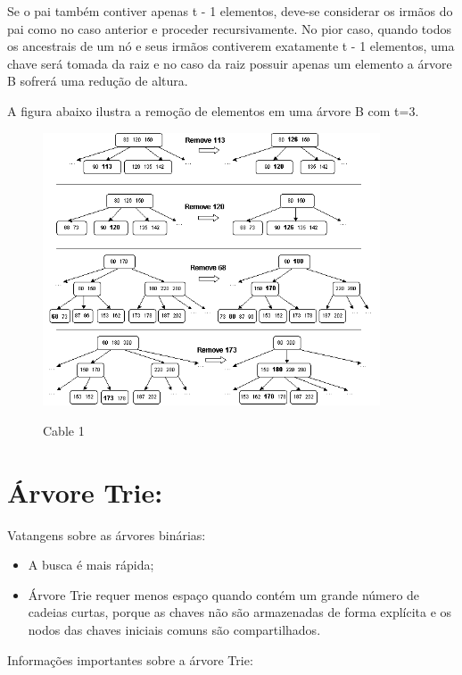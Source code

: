 \documentclass{article}
\begin{document}
Se o pai também contiver apenas t - 1 elementos, deve-se considerar os irmãos do pai como no caso
anterior e proceder recursivamente. No pior caso, quando todos os ancestrais de um nó e seus irmãos
contiverem exatamente t - 1 elementos, uma chave será tomada da raiz e no caso da raiz possuir
apenas um elemento a árvore B sofrerá uma redução de altura.

A figura abaixo ilustra a remoção de elementos em uma árvore B com t=3.

\begin{figure}[h]
    \center
    \includegraphics[width=10cm]{imagens/arvb7.png}
    \label{cable}
    \caption{Cable 1}
\end{figure}

\newpage

\section{Árvore Trie:}

Vatangens sobre as árvores binárias:

\begin{itemize}
   \item A busca é mais rápida;
   \item Árvore Trie requer menos espaço quando contém um grande número de cadeias curtas, porque as chaves
não são armazenadas de forma explícita e os nodos das chaves iniciais comuns são compartilhados.
\end{itemize}

Informações importantes sobre a árvore Trie:
\end{document}
